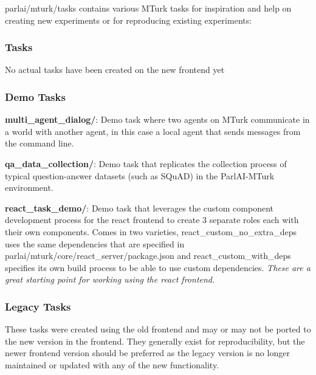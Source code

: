 {\ttfamily parlai/mturk/tasks} contains various M\+Turk tasks for inspiration and help on creating new experiments or for reproducing existing experiments\+:

\subsubsection*{Tasks}

No actual tasks have been created on the new frontend yet

\subsubsection*{Demo Tasks}


\begin{DoxyItemize}
\item {\bfseries multi\+\_\+agent\+\_\+dialog/}\+: Demo task where two agents on M\+Turk communicate in a world with another agent, in this case a local agent that sends messages from the command line.
\item {\bfseries qa\+\_\+data\+\_\+collection/}\+: Demo task that replicates the collection process of typical question-\/answer datasets (such as S\+Qu\+AD) in the Parl\+A\+I-\/\+M\+Turk environment.
\item {\bfseries react\+\_\+task\+\_\+demo/}\+: Demo task that leverages the custom component development process for the react frontend to create 3 separate roles each with their own components. Comes in two varieties, {\ttfamily react\+\_\+custom\+\_\+no\+\_\+extra\+\_\+deps} uses the same dependencies that are specified in {\ttfamily parlai/mturk/core/react\+\_\+server/package.\+json} and {\ttfamily react\+\_\+custom\+\_\+with\+\_\+deps} specifies its own build process to be able to use custom dependencies. {\itshape These are a great starting point for working using the react frontend.}
\end{DoxyItemize}

\subsubsection*{Legacy Tasks}

These tasks were created using the old frontend and may or may not be ported to the new version in the frontend. They generally exist for reproducibility, but the newer frontend version should be preferred as the legacy version is no longer maintained or updated with any of the new functionality.


